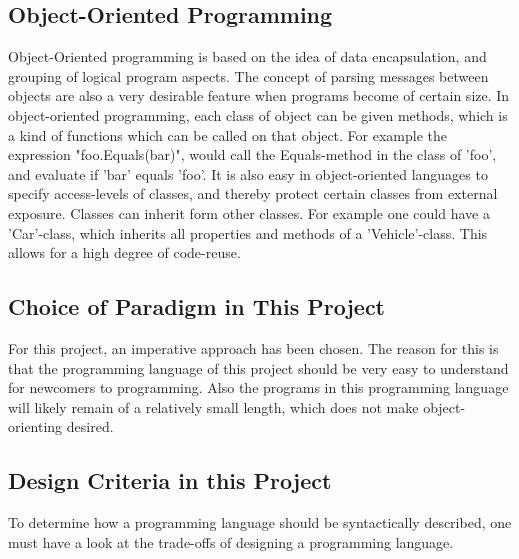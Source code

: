 \subsection{Object-Oriented Programming}
Object-Oriented programming is based on the idea of data encapsulation, and grouping of logical program aspects. The concept of parsing messages between objects are also a very desirable feature when programs become of certain size. In object-oriented programming, each class of object can be given methods, which is a kind of functions which can be called on that object. For example the expression "foo.Equals(bar)", would call the Equals-method in the class of 'foo', and evaluate if 'bar' equals 'foo'. It is also easy in object-oriented languages to specify access-levels of classes, and thereby protect certain classes from external exposure.  Classes can inherit form other classes. For example one could have a 'Car'-class, which inherits all properties and methods of a 'Vehicle'-class. This allows for a high degree of code-reuse. 

\subsection{Choice of Paradigm in This Project}
For this project, an imperative approach has been chosen. The reason for this is that the programming language of this project should be very easy to understand for newcomers to programming. Also the programs in this programming language will likely remain of a relatively small length, which does not make object-orienting desired.

\subsection{Design Criteria in this Project}
To determine how a programming language should be syntactically described, one must have a look at the trade-offs of designing a programming language. 

